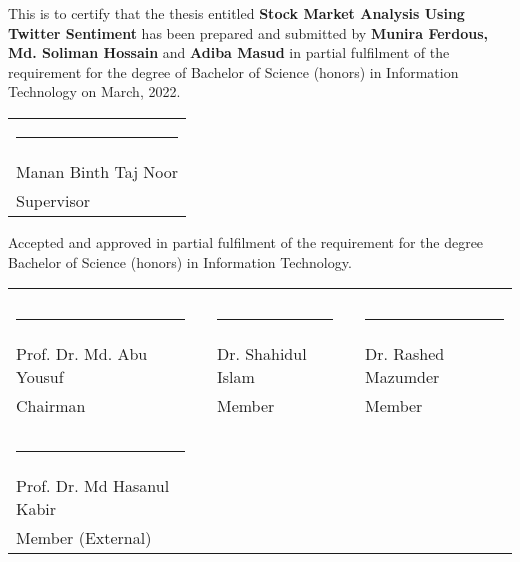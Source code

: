 This is to certify that the thesis entitled \textbf{Stock Market Analysis Using Twitter Sentiment} has been prepared and submitted by \textbf{Munira Ferdous, Md. Soliman Hossain} and \textbf{Adiba Masud} in partial fulfilment of the requirement for the degree of
Bachelor of Science (honors) in Information Technology on March, 2022.
\bigskip
\bigskip
\bigskip

\noindent \begin{tabular}{l}
\rule{4cm}{1pt} \\
Manan Binth Taj Noor\\Supervisor
\end{tabular}

\vspace{.3in}
Accepted and approved in partial fulfilment of the requirement for the degree
Bachelor of Science (honors) in Information Technology.
\vspace{.3in}


\noindent \begin{tabular}{p{4.5cm}p{.5cm}p{4.5cm}p{.5cm}p{4.5cm}}
\centering
     && &&   \\
     && &&   \\
  \rule{4.5cm}{1pt} &  & \rule{4.5cm}{1pt} &  & \rule{4.5cm}{1pt}\\
  Prof. Dr. Md. Abu Yousuf &&Dr. Shahidul Islam &&Dr. Rashed Mazumder\\
  Chairman &&Member &&Member\\
     
     && &&   \\
     && &&   \\
  \rule{5cm}{1pt}\\
  Prof. Dr. Md Hasanul Kabir \\
  Member (External) 
\end{tabular}

